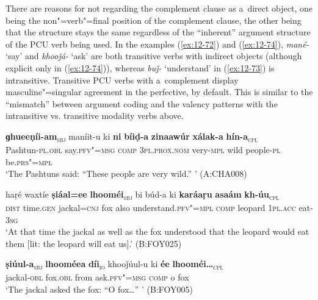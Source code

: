 There are reasons for not regarding the complement clause as a~direct object, one being the non"=verb"=final position of the complement clause, the other being that the structure stays the same regardless of the ``inherent'' argument structure of the PCU verb being used. In the examples (\ref{ex:12-72}) and (\ref{ex:12-74}), \textit{mané-} `say' and \textit{khooǰá-} `ask' are both transitive verbs with indirect objects (although explicit only in (\ref{ex:12-74})), whereas \textit{buǰ-} `understand' in (\ref{ex:12-73}) is intransitive. Transitive PCU verbs with a~complement display masculine"=singular agreement in the perfective, by default. This is similar to the ``mismatch'' between argument coding and the valency patterns with the intransitive vs. transitive modality verbs above.

\begin{exe}
\ex
\label{ex:12-72}
\gll {\ob}\textbf{ɡhueeṇíi-am}{\cb}\textsubscript{\textsc{\upshape sbj}} maníit-u ki {\ob}\textbf{ni} \textbf{bíiḍ-a} \textbf{zinaawúr} \textbf{xálak-a} \textbf{hín-a}{\cb}\textsubscript{\textsc{\upshape cpl}}\\
Pashtun-\textsc{pl.obl} say.\textsc{pfv"=msg} \textsc{c}\textsc{om}\textsc{p} \textsc{3pl.prox.nom} very-\textsc{mpl} wild people-\textsc{pl} be.\textsc{prs"=mpl}\\
\glt `The Pashtuns said: ``These people are very wild.'' ' (A:CHA008)
\end{exe}
\begin{exe}
\ex
\label{ex:12-73}
\gll haṛé waxtíe {\ob}\textbf{ṣiáal=ee} \textbf{lhooméi}{\cb}\textsubscript{\textsc{\upshape sbj}} bi búd-a ki {\ob}\textbf{karáaṛu} \textbf{asaám} \textbf{kh-úu}{\cb}\textsubscript{\textsc{\upshape cpl}}\\
\textsc{dist} time.\textsc{gen} jackal=\textsc{cnj} fox also understand.\textsc{pfv"=mpl} \textsc{comp} leopard \textsc{1pl.acc} eat-\textsc{3sg}\\
\glt `At that time the jackal as well as the fox understood that the leopard would eat them [lit: the leopard will eat us].' (B:FOY025)
\end{exe}

\begin{exe}
\ex
\label{ex:12-74}
\gll {\ob}\textbf{ṣiúul-a}{\cb}\textsubscript{\textsc{\upshape sbj}} {\ob}\textbf{lhooméea} \textbf{díi}{\cb}\textsubscript{\textsc{io}} khooǰúul-u ki {\ob}\textbf{ée} \textbf{lhooméi{\ldots}}{\cb}\textsubscript{\textsc{\upshape cpl}} \\
jackal-\textsc{obl} fox.\textsc{obl} from ask.\textsc{pfv"=msg} \textsc{comp} o fox \\
\glt `The jackal asked the fox: ``O fox{\ldots}'' ' (B:FOY005)
\end{exe}

